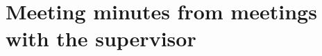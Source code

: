 \chapter{Meeting minutes from meetings with the supervisor}
\newpage

\newpage

\newpage

\newpage

\newpage

\newpage

\newpage

\newpage

\newpage

\newpage
